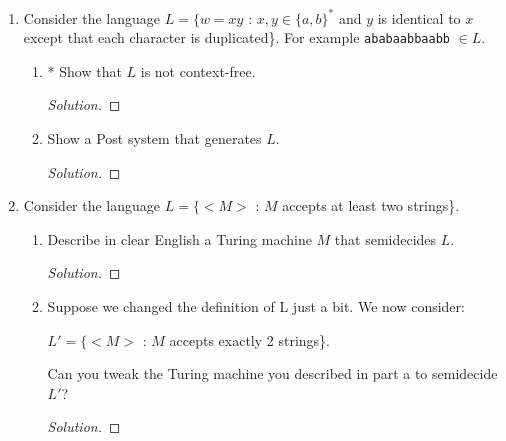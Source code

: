 \documentclass[10pt]{article}
\begin{document}
\begin{enumerate}[1)]
\noindent
Now suppose that we take an arbitrary question for which a decision procedure exists.  If the question can be reformulated as a language, then the language will be in $D$ iff there exists a decision procedure to answer the question.  For each of the following problems, your answers should be a precise description of an algorithm.  It need not be the description of a Turing Machine:
\begin{enumerate}
\item
* Let $L = \{<M>$ : $M$ is a DFSM that doesn’t accept any string containing an odd number of 1’s\}.  Show that 
$L$ is in $D$.
\begin{proof}[Solution]
\end{proof}

\item
Consider the problem of testing whether a DFSM and a regular expression are equivalent.  Express this problem as a language and show that it is in $D$.
\begin{proof}[Solution]
\end{proof}
\end{enumerate}



\item
Consider the language  $L = \{w = xy$ :  $x, y \in \{a, b\}^*$ and $y$ is identical to $x$ except that each character is 
duplicated\}.  For example \texttt{ababaabbaabb} $\in L$.
\begin{enumerate}
\item
* Show that $L$ is not context-free.
\begin{proof}[Solution]
\end{proof}

\item
Show a Post system that generates $L$.
\begin{proof}[Solution]
\end{proof}
\end{enumerate}



\item
Consider the language $L = \{<M>$ : $M$ accepts at least two strings\}.
\begin{enumerate}
\item
Describe in clear English a Turing machine $M$ that semidecides $L$.
\begin{proof}[Solution]
\end{proof}

\item
Suppose we changed the definition of L just a bit.  We now consider:
\begin{center}
$L' = \{<M>$ : $M$ accepts exactly 2 strings\}.
\end{center}
Can you tweak the Turing machine you described in part a to semidecide $L'$?
\begin{proof}[Solution]
\end{proof}
\end{enumerate}
\end{enumerate}
\end{document}
